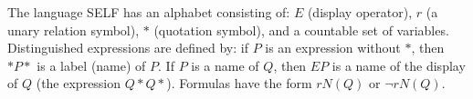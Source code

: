 The language SELF has an alphabet consisting of: $E$ (display operator), $r$ (a unary relation symbol), $*$ (quotation symbol), and a countable set of variables. Distinguished expressions are defined by: if $P$ is an expression without $*$, then $*P*$ is a label (name) of $P$. If $P$ is a name of $Q$, then $EP$ is a name of the display of $Q$ (the expression $Q * Q*$). Formulas have the form $rN(Q)$ or $\neg rN(Q)$.
